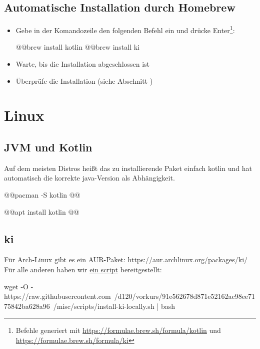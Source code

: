 \subsection*{Automatische Installation durch Homebrew}
\begin{itemize}
    \item Gebe in der Komandozeile den folgenden Befehl ein und drücke Enter\footnote{Befehle generiert mit \url{https://formulae.brew.sh/formula/kotlin} und \url{https://formulae.brew.sh/formula/ki}}:
\begin{commandshell}
@\shellprefix{}@brew install kotlin
@\shellprefix{}@brew install ki
\end{commandshell}
    \item Warte, bis die Installation abgeschlossen ist
    \item Überprüfe die Installation (siehe Abschnitt )
\end{itemize}

\section*{Linux}
\subsection*{JVM und Kotlin}
Auf dem meisten Distros heißt das zu installierende Paket einfach {\ttfamily kotlin} und hat automatisch die korrekte java-Version als Abhängigkeit.
\begin{commandshell}[][minted language=text]
    @\shellprefix{}@pacman -S kotlin @@
\end{commandshell}

\begin{commandshell}[][minted language=text]
    @\shellprefix{}@apt install kotlin @@
\end{commandshell}

\subsection*{ki}
Für Arch-Linux gibt es ein AUR-Paket: \url{https://aur.archlinux.org/packages/ki/}
Für alle anderen haben wir \href{https://raw.githubusercontent.com/d120/vorkurs/91e562678d871e52162ac98ee7175842ba628a96/misc/scripts/install-ki-locally.sh}{ein script} bereitgestellt:
\begin{commandshell}
    wget -O - https://raw.githubusercontent.com\
    /d120/vorkurs/91e562678d871e52162ac98ee7175842ba628a96\
    /misc/scripts/install-ki-locally.sh | bash
\end{commandshell}

